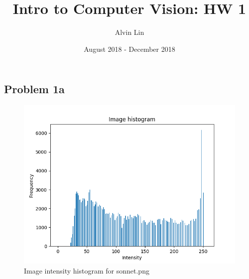 \documentclass{math}
\title{Intro to Computer Vision: HW 1}
\author{Alvin Lin}
\date{August 2018 - December 2018}
\begin{document}
\maketitle
\captionsetup{justification=centering}

\subsection*{Problem 1a}
\begin{figure}[H]
  \centering
  \includegraphics[width=12cm]{assets/hw_01_sonnet_histogram.png}
  \caption{Image intensity histogram for sonnet.png}
\end{figure}
\end{document}

